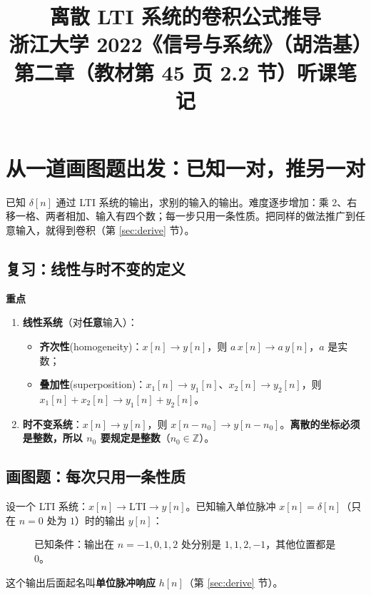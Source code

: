 \documentclass[UTF8,a4paper,11pt]{ctexart}
\title{离散 LTI 系统的卷积公式推导\\\large 浙江大学 2022《信号与系统》（胡浩基）第二章（教材第 45 页 2.2 节）听课笔记}
\author{}
\date{}
\newenvironment{remember}{\begin{rememberbox}\textbf{重点}\par\smallskip}{\end{rememberbox}}
\newcommand{\stemr}[7]{%
  \begin{scope}[shift={(#1,#2)},x=0.38cm,y=#5 cm]
    \pgfmathtruncatemacro{\len}{dim({#4,0})-1}%
    \pgfmathtruncatemacro{\ymax}{max(#4,#4)}%
    \pgfmathtruncatemacro{\ymin}{min(#4,#4)}%
    \pgfmathsetmacro{\ybot}{min(-0.45/#5,\ymin-0.12/#5)}%
    \draw[->] ({#6-0.5},0) -- ({#7+0.7},0) node[right,font=\tiny] {$n$};
    \draw[->] (0,\ybot) -- (0,{1.9/#5});
    \foreach \v [count=\k from 0] in {#4}{%
      \pgfmathtruncatemacro{\nn}{#3+\k}
      \draw[thick,blue!60!black] (\nn,0) -- (\nn,\v);
      \node[circle,fill=blue!60!black,inner sep=1.1pt] at (\nn,\v) {};
      \ifnum\nn<0 \def\side{east}\else\def\side{west}\fi
      \ifnum\v>0 \node[font=\scriptsize,anchor=south \side,inner sep=1pt] at (\nn,\v) {\v};\fi
      \ifnum\v<0 \node[font=\scriptsize,anchor=north \side,inner sep=1pt] at (\nn,\v) {\v};\fi}%
    \foreach \t in {#6,...,#7}{%
      \pgfmathtruncatemacro{\kk}{\t-(#3)}%
      \def\vv{0}%
      \ifnum\kk>-1 \ifnum\kk<\len\relax \pgfmathtruncatemacro{\vv}{{#4,0}[\kk]}\fi\fi
      \draw (\t,0) -- (\t,{-0.09/#5});
      \ifnum\vv<0
        \node[font=\tiny,gray!60!black,anchor=south,fill=white,inner sep=0.6pt] at (\t,{0.04/#5}) {$\t$};
      \else
        \node[font=\tiny,gray!60!black,anchor=north,fill=white,inner sep=0.6pt] at (\t,{-0.09/#5}) {$\t$};
      \fi}%
    \ifnum\ymax>0
      \draw (0,\ymax) -- (-0.2,\ymax) node[anchor=east,font=\tiny,gray!60!black,fill=white,inner sep=0.6pt] {$\ymax$};
    \fi
    \pgfmathtruncatemacro{\showmin}{(\ymin*#5)<-0.33}%
    \ifnum\showmin=1
      \draw (0,\ymin) -- (-0.2,\ymin) node[anchor=east,font=\tiny,gray!60!black,fill=white,inner sep=0.6pt] {$\ymin$};
    \fi
  \end{scope}}
\newcommand{\stemat}[5]{\stemr{#1}{#2}{#3}{#4}{#5}{-3}{5}}
\newcommand{\ltirow}[9]{%
  \node[anchor=east,font=\footnotesize] at (2.9,{#1+0.7}) {#7};
  \stemat{4.6}{#1}{#2}{#3}{#6}
  \draw[->,thick] (6.9,{#1+0.5}) -- (7.9,{#1+0.5});
  \node[font=\footnotesize,above] at (7.4,{#1+0.5}) {LTI};
  \stemat{10.6}{#1}{#4}{#5}{#9}
  \node[anchor=west,font=\footnotesize,text width=2.4cm] at (12.9,{#1+0.7}) {#8};}
\newcounter{ex}[section]
\begin{document}
\pagestyle{plain}
\maketitle

\section{从一道画图题出发：已知一对，推另一对}\label{sec:draw}
已知 $\delta[n]$ 通过 LTI 系统的输出，求别的输入的输出。难度逐步增加：乘 $2$、右移一格、两者相加、输入有四个数；每一步只用一条性质。把同样的做法推广到任意输入，就得到卷积（第 \ref{sec:derive} 节）。

\subsection{复习：线性与时不变的定义}
\begin{remember}
\begin{enumerate}[nosep]
\item \textbf{线性系统}（对\textbf{任意}输入）：
  \begin{itemize}[nosep]
  \item \textbf{齐次性}(homogeneity)：$x[n]\to y[n]$，则 $a\,x[n]\to a\,y[n]$，$a$ 是实数；
  \item \textbf{叠加性}(superposition)：$x_1[n]\to y_1[n]$、$x_2[n]\to y_2[n]$，则 $x_1[n]+x_2[n]\to y_1[n]+y_2[n]$。
  \end{itemize}
\item \textbf{时不变系统}：$x[n]\to y[n]$，则 $x[n-n_0]\to y[n-n_0]$。\textbf{离散的坐标必须是整数，所以 $n_0$ 要规定是整数}（$n_0\in\mathbb{Z}$）。
\end{enumerate}
\end{remember}

\subsection{画图题：每次只用一条性质}
设一个 LTI 系统：$x[n]\to\boxed{\text{LTI}}\to y[n]$。已知输入单位脉冲 $x[n]=\delta[n]$（只在 $n=0$ 处为 $1$）时的输出 $y[n]$：

\begin{figure}[H]
\centering
{}
\caption{已知条件：输出在 $n=-1,0,1,2$ 处分别是 $1,1,2,-1$，其他位置都是 $0$。}
\end{figure}
这个输出后面起名叫\textbf{单位脉冲响应} $h[n]$（第 \ref{sec:derive} 节）。
\end{document}
